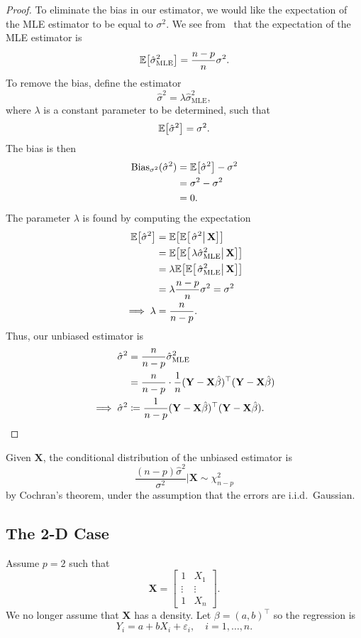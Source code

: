 \documentclass[letterpaper, reqno]{amsart}
\numberwithin{equation}{section}
\newcommand{\T}{\top} %
\newcommand{\vect}[1]{\boldsymbol{\mathbf{#1}}} %
\newcommand{\E}[1]{\mathbb{E}\mleft[#1\mright]}
\newcommand{\iid}{i.i.d.}
\newcommand{\Xm}{\vect{X}}
\newcommand{\Yv}{\vect{Y}}
\newcommand{\Bv}{\beta}
\newcommand{\Bvh}{\hat{\beta}}
\newcommand{\ve}{\varepsilon}
\begin{document}
\begin{proof}
  To eliminate the bias in our estimator, we would like the expectation of the MLE
  estimator to be equal to $\sigma^2$. We see from~ that the
  expectation of the MLE estimator is
  \[ \E{\hat{\sigma}^2_\mathrm{MLE}} = \frac{n-p}{n} \sigma^2. \]
  To remove the bias, define the estimator
  \[ \hat{\sigma}^2 = \lambda \hat{\sigma}^2_\mathrm{MLE}, \]
  where $\lambda$ is a constant parameter to be determined, such that
  \[ \E{\hat{\sigma}^2} = \sigma^2. \]
  The bias is then
  \begin{align*}
    \mathrm{Bias}_{\sigma^2}(\hat{\sigma}^2) &= \E{\hat{\sigma}^2} - \sigma^2 \\
    &= \sigma^2 - \sigma^2 \\
    &= 0.
  \end{align*}
  The parameter $\lambda$ is found by computing the expectation
  \begin{align*}
    \E{\hat{\sigma}^2} &= \E{\E{\left. \hat{\sigma}^2 \right| \Xm}} \\
    &= \E{\E{\left. \lambda \hat{\sigma}^2_\mathrm{MLE} \right| \Xm}} \\
    &= \lambda \E{\E{\left. \hat{\sigma}^2_\mathrm{MLE} \right| \Xm}} \\
    &= \lambda \frac{n-p}{n} \sigma^2 = \sigma^2 \\
    \implies \lambda &= \frac{n}{n-p}.
  \end{align*}
  Thus, our unbiased estimator is
  \begin{align*}
    \hat{\sigma}^2 &= \frac{n}{n-p} \hat{\sigma}^2_\mathrm{MLE} \\
    &= \frac{n}{n-p} \cdot \frac{1}{n}(\Yv - \Xm\Bvh)^\T(\Yv - \Xm\Bvh) \\
  \implies \hat{\sigma}^2  &\coloneqq \frac{1}{n-p} (\Yv - \Xm\Bvh)^\T(\Yv - \Xm\Bvh). \qedhere
  \end{align*}
\end{proof}

Given $\Xm$, the conditional distribution of the unbiased estimator is
\[ \frac{(n-p)\hat{\sigma}^2}{\sigma^2} \Big| \Xm \sim \chi^2_{n-p} \]
by Cochran's theorem, under the assumption that the errors are \iid\ Gaussian.

\subsection{The 2-D Case}
Assume $p = 2$ such that 
\begin{equation} \label{eq:Xm}
   \Xm = \begin{bmatrix} 1 & X_1 \\ \vdots & \vdots \\ 1 & X_n \end{bmatrix}.
\end{equation}
We no longer assume that $\Xm$ has a density. %
Let $\Bv = (a, b)^\T$ so the regression is
\[ Y_i = a + bX_i + \ve_i, \quad i = 1, \dots, n. \]
\end{document}
